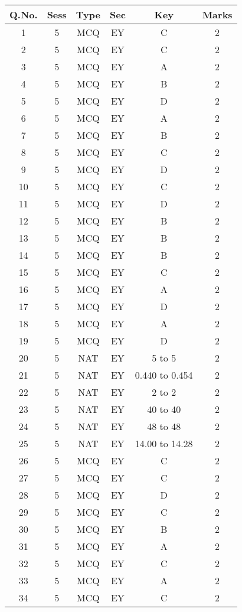 \begin{table}[htbp]
\centering
\scriptsize
\begin{tabular}{|c|c|c|c|c|c|}
\hline
Q.No. & Sess & Type & Sec & Key & Marks \\
\hline
1  & 5 & MCQ & EY & C & 2 \\
2  & 5 & MCQ & EY & C & 2 \\
3  & 5 & MCQ & EY & A & 2 \\
4  & 5 & MCQ & EY & B & 2 \\
5  & 5 & MCQ & EY & D & 2 \\
6  & 5 & MCQ & EY & A & 2 \\
7  & 5 & MCQ & EY & B & 2 \\
8  & 5 & MCQ & EY & C & 2 \\
9  & 5 & MCQ & EY & D & 2 \\
10 & 5 & MCQ & EY & C & 2 \\
11 & 5 & MCQ & EY & D & 2 \\
12 & 5 & MCQ & EY & B & 2 \\
13 & 5 & MCQ & EY & B & 2 \\
14 & 5 & MCQ & EY & B & 2 \\
15 & 5 & MCQ & EY & C & 2 \\
16 & 5 & MCQ & EY & A & 2 \\
17 & 5 & MCQ & EY & D & 2 \\
18 & 5 & MCQ & EY & A & 2 \\
19 & 5 & MCQ & EY & D & 2 \\
20 & 5 & NAT & EY & 5 to 5 & 2 \\
21 & 5 & NAT & EY & 0.440 to 0.454 & 2 \\
22 & 5 & NAT & EY & 2 to 2 & 2 \\
23 & 5 & NAT & EY & 40 to 40 & 2 \\
24 & 5 & NAT & EY & 48 to 48 & 2 \\
25 & 5 & NAT & EY & 14.00 to 14.28 & 2 \\
26 & 5 & MCQ & EY & C & 2 \\
27 & 5 & MCQ & EY & C & 2 \\
28 & 5 & MCQ & EY & D & 2 \\
29 & 5 & MCQ & EY & C & 2 \\
30 & 5 & MCQ & EY & B & 2 \\
31 & 5 & MCQ & EY & A & 2 \\
32 & 5 & MCQ & EY & C & 2 \\
33 & 5 & MCQ & EY & A & 2 \\
34 & 5 & MCQ & EY & C & 2 \\

\end{tabular}
\end{table}
